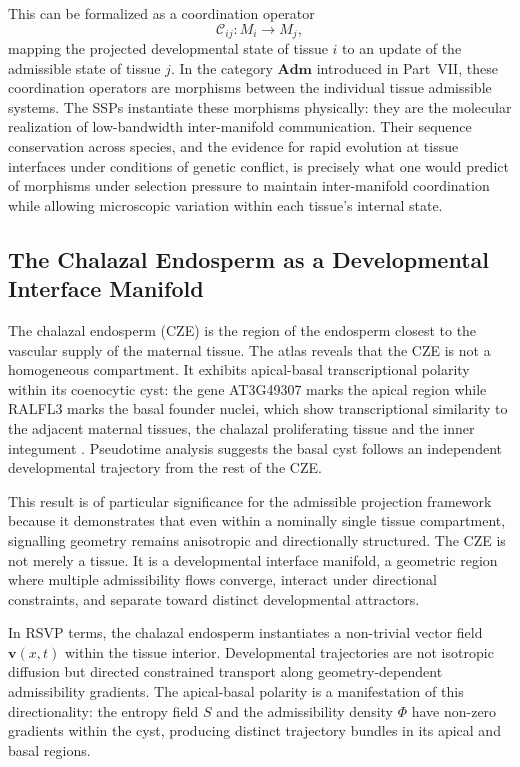 \documentclass[12pt, a4paper]{article}
\theoremstyle{essaystyle}
\begin{document}
This can be formalized as a coordination operator
\[
\mathcal{C}_{ij} : M_i \longrightarrow M_j,
\]
mapping the projected developmental state of tissue $i$ to an update of the admissible
state of tissue $j$. In the category $\mathbf{Adm}$ introduced in Part~VII, these
coordination operators are morphisms between the individual tissue admissible systems.
The SSPs instantiate these morphisms physically: they are the molecular realization
of low-bandwidth inter-manifold communication. Their sequence conservation across
species, and the evidence for rapid evolution at tissue interfaces under conditions of
genetic conflict, is precisely what one would predict of morphisms under selection
pressure to maintain inter-manifold coordination while allowing microscopic variation
within each tissue's internal state.

\subsection{The Chalazal Endosperm as a Developmental Interface Manifold}

The chalazal endosperm (CZE) is the region of the endosperm closest to the vascular
supply of the maternal tissue. The atlas reveals that the CZE is not a homogeneous
compartment. It exhibits apical-basal transcriptional polarity within its coenocytic
cyst: the gene AT3G49307 marks the apical region while RALFL3 marks the basal founder
nuclei, which show transcriptional similarity to the adjacent maternal tissues,
the chalazal proliferating tissue and the inner integument \citep{martin2026atlas}.
Pseudotime analysis suggests the basal cyst follows an independent developmental
trajectory from the rest of the CZE.

This result is of particular significance for the admissible projection framework
because it demonstrates that even within a nominally single tissue compartment,
signalling geometry remains anisotropic and directionally structured. The CZE is not
merely a tissue. It is a developmental interface manifold, a geometric region where
multiple admissibility flows converge, interact under directional constraints, and
separate toward distinct developmental attractors.

In RSVP terms, the chalazal endosperm instantiates a non-trivial vector field
$\mathbf{v}(x, t)$ within the tissue interior. Developmental trajectories are not
isotropic diffusion but directed constrained transport along geometry-dependent
admissibility gradients. The apical-basal polarity is a manifestation of this
directionality: the entropy field $S$ and the admissibility density $\Phi$ have
non-zero gradients within the cyst, producing distinct trajectory bundles in its
apical and basal regions.
\end{document}
